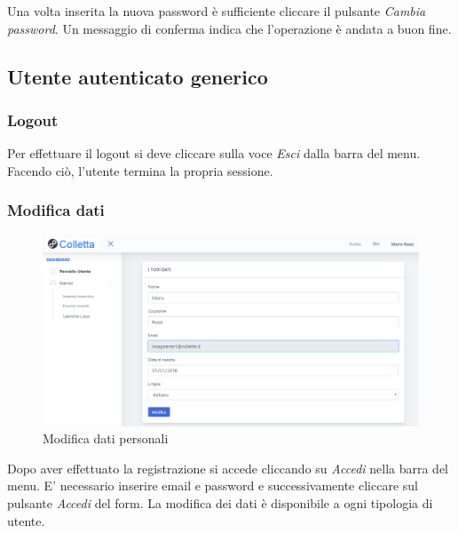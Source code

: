 Una volta inserita la nuova password è sufficiente cliccare il pulsante \textit{Cambia password}. Un messaggio di conferma indica che l'operazione è andata a buon fine.	
	
\subsection{Utente autenticato generico}

    \subsubsection{Logout}
    Per effettuare il {logout} si deve cliccare sulla voce \textit{Esci} dalla barra del menu. Facendo ciò, l'utente termina la propria sessione.
    \subsubsection{Modifica dati}
    	\begin{figure}[H]
        	\centering
        	\includegraphics[width=1\linewidth]{sez/img/autenticazione/modati.PNG} 
        	\caption{Modifica dati personali}\label{fig:1}
    	\end{figure}
    Dopo aver effettuato la registrazione si accede cliccando su \textit{Accedi} nella barra del menu. E' necessario inserire email e password e successivamente cliccare sul pulsante \textit{Accedi} del form. La modifica dei dati è disponibile a ogni tipologia di utente.

\newpage

